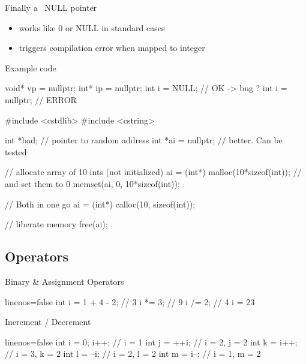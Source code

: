 \begin{frame}[fragile]
  \begin{block}{Finally a \cpp~NULL pointer}
    \begin{itemize}
    \item works like 0 or NULL in standard cases
    \item triggers compilation error when mapped to integer
    \end{itemize}
  \end{block}
  \pause
  \begin{exampleblock}{Example code}
    \begin{cppcode*}{}
      void* vp = nullptr;
      int* ip = nullptr;
      int i = NULL;      // OK -> bug ?
      int i = nullptr;   // ERROR
    \end{cppcode*}
  \end{exampleblock}
\end{frame}

\begin{frame}[fragile]
  \begin{cppcode}
    #include <cstdlib>
    #include <cstring>

    int *bad;          // pointer to random address
    int *ai = nullptr; // better. Can be tested

    // allocate array of 10 ints (not initialized)
    ai = (int*) malloc(10*sizeof(int));
    // and set them to 0
    memset(ai, 0, 10*sizeof(int));

    // Both in one go
    ai = (int*) calloc(10, sizeof(int));
    
    // liberate memory
    free(ai);
  \end{cppcode}
\end{frame}

\subsection{Operators}

\begin{frame}[fragile]
  \begin{block}{Binary \& Assignment Operators}
    \begin{cppcode*}{linenos=false}
      int i = 1 + 4 - 2;  // 3
      i *= 3;             // 9
      i /= 2;             // 4
      i = 23 %
    \end{cppcode*}
  \end{block}
  \pause
  \begin{block}{Increment / Decrement }
    \begin{cppcode*}{linenos=false}
      int i = 0; i++; // i = 1
      int j = ++i;    // i = 2, j = 2
      int k = i++;    // i = 3, k = 2
      int l = --i;    // i = 2, l = 2
      int m = i--;    // i = 1, m = 2
    \end{cppcode*}
  \end{block}
\end{frame}

